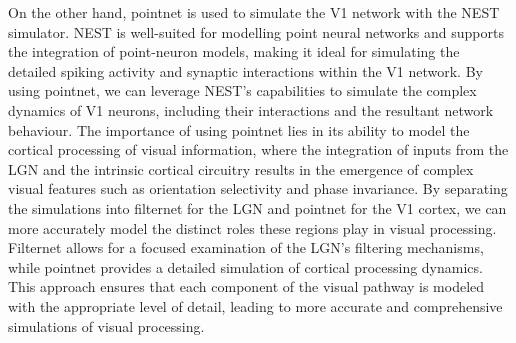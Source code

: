 \documentclass[12pt]{article}
\begin{document}
\noindent On the other hand, pointnet is used to simulate the V1 network with the NEST simulator. NEST is well-suited for modelling point neural networks and supports the integration of point-neuron models, making it ideal for simulating the detailed spiking activity and synaptic interactions within the V1 network. By using pointnet, we can leverage NEST's capabilities to simulate the complex dynamics of V1 neurons, including their interactions and the resultant network behaviour. The importance of using pointnet lies in its ability to model the cortical processing of visual information, where the integration of inputs from the LGN and the intrinsic cortical circuitry results in the emergence of complex visual features such as orientation selectivity and phase invariance. By separating the simulations into filternet for the LGN and pointnet for the V1 cortex, we can more accurately model the distinct roles these regions play in visual processing. Filternet allows for a focused examination of the LGN's filtering mechanisms, while pointnet provides a detailed simulation of cortical processing dynamics. This approach ensures that each component of the visual pathway is modeled with the appropriate level of detail, leading to more accurate and comprehensive simulations of visual processing.
\end{document}
